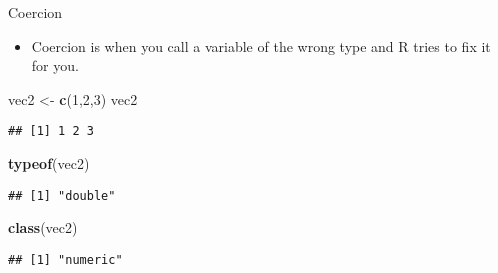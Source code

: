 \documentclass[ignorenonframetext,]{beamer}
\newenvironment{Shaded}{\begin{snugshade}}{\end{snugshade}}
\newcommand{\KeywordTok}[1]{\textcolor[rgb]{0.13,0.29,0.53}{\textbf{#1}}}
\newcommand{\DecValTok}[1]{\textcolor[rgb]{0.00,0.00,0.81}{#1}}
\newcommand{\StringTok}[1]{\textcolor[rgb]{0.31,0.60,0.02}{#1}}
\newcommand{\NormalTok}[1]{#1}
\providecommand{\tightlist}{%
	\setlength{\itemsep}{0pt}\setlength{\parskip}{0pt}}
\begin{document}
\begin{frame}[fragile]{Coercion}

\begin{itemize}
\tightlist
\item
  Coercion is when you call a variable of the wrong type and R tries to
  fix it for you.
\end{itemize}

\begin{Shaded}
\begin{Highlighting}[]
\NormalTok{vec2 <-}\StringTok{ }\KeywordTok{c}\NormalTok{(}\DecValTok{1}\NormalTok{,}\DecValTok{2}\NormalTok{,}\DecValTok{3}\NormalTok{)}
\NormalTok{vec2}
\end{Highlighting}
\end{Shaded}

\begin{verbatim}
## [1] 1 2 3
\end{verbatim}

\begin{Shaded}
\begin{Highlighting}[]
\KeywordTok{typeof}\NormalTok{(vec2)}
\end{Highlighting}
\end{Shaded}

\begin{verbatim}
## [1] "double"
\end{verbatim}

\begin{Shaded}
\begin{Highlighting}[]
\KeywordTok{class}\NormalTok{(vec2)}
\end{Highlighting}
\end{Shaded}

\begin{verbatim}
## [1] "numeric"
\end{verbatim}

\end{frame}
\end{document}
